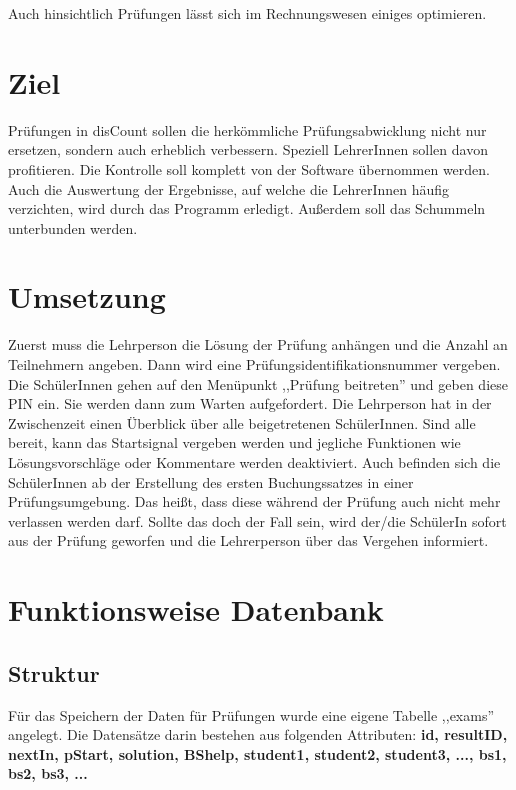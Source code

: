 \documentclass[12pt]{report}
\begin{document}
Auch hinsichtlich Prüfungen lässt sich im Rechnungswesen einiges optimieren.
 
\section{Ziel}
Prüfungen in disCount sollen die herkömmliche Prüfungsabwicklung nicht nur ersetzen, sondern auch erheblich verbessern. Speziell LehrerInnen sollen davon profitieren. Die Kontrolle soll komplett von der Software übernommen werden. Auch die Auswertung der Ergebnisse, auf welche die LehrerInnen häufig verzichten, wird durch das Programm erledigt. Außerdem soll das Schummeln unterbunden werden.
  
\section{Umsetzung}
Zuerst muss die Lehrperson die Lösung der Prüfung anhängen und die Anzahl an Teilnehmern angeben. Dann wird eine Prüfungsidentifikationsnummer vergeben. Die SchülerInnen gehen auf den Menüpunkt ,,Prüfung beitreten'' und geben diese PIN ein. Sie werden dann zum Warten aufgefordert. Die Lehrperson hat in der Zwischenzeit einen Überblick über alle beigetretenen SchülerInnen. Sind alle bereit, kann das Startsignal vergeben werden und jegliche Funktionen wie Lösungsvorschläge oder Kommentare werden deaktiviert. Auch befinden sich die SchülerInnen ab der Erstellung des ersten Buchungssatzes in einer Prüfungsumgebung. Das heißt, dass diese während der Prüfung auch nicht mehr verlassen werden darf. Sollte das doch der Fall sein, wird der/die SchülerIn sofort aus der Prüfung geworfen und die Lehrerperson über das Vergehen informiert. 
  
\section{Funktionsweise Datenbank}
  
\subsection{Struktur}
  
Für das Speichern der Daten für Prüfungen wurde eine eigene Tabelle ,,exams'' angelegt. Die Datensätze darin bestehen aus folgenden Attributen: \newline\newline \textbf{id, resultID, nextIn, pStart, solution, BShelp, student1, student2, student3, ..., bs1, bs2, bs3, ...} \newline
  
\end{document}
